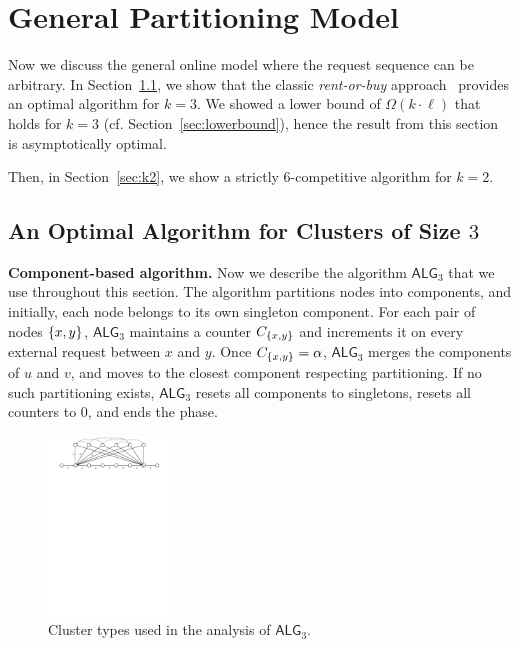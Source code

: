 \documentclass[manuscript,screen=true, review, anonymous]{acmart}
\newcommand{\OPT}{\textsf{OPT}\xspace}
\newcommand{\OBRP}{BRP}
\newcommand{\TAlg}{{\ensuremath{\textsf{ALG}_{3}}}\xspace}
\DeclarePairedDelimiter\set{\{}{\}}
\newcommand\maciek[1]{}
\begin{document}

\section{General Partitioning Model}
\label{sec:part}


Now  we discuss the general online
model where the request sequence
can be arbitrary.
In Section~\ref{sec:k3}, we show that the classic \emph{rent-or-buy} approach~\cite{karlin-ski-rental} provides an optimal algorithm for $k=3$.
We showed a lower bound of $\Omega(k \cdot \ell)$ that holds for $k=3$ (cf. Section~\ref{sec:lowerbound}), hence the result from this section is asymptotically optimal.

Then, in Section~\ref{sec:k2}, we show a strictly $6$-competitive algorithm for $k=2$.
\maciek{Intro: compare to previous 7-competitive algorithm. Note strict competitive ratio vs large additive term. Also, emphasize that the algorithm is different than 7-competitive}



\subsection{An Optimal Algorithm for Clusters of Size $3$}
\label{sec:k3}




\noindent
\textbf{Component-based algorithm.}
Now we describe the algorithm \TAlg that we use throughout this section.
The algorithm partitions nodes into components, and
initially, each node belongs to its own singleton component.
For each pair of nodes $\set{x,y}$, \TAlg maintains a counter $C_{\set{x,y}}$ and increments it on every external request between $x$ and $y$.
Once $C_{\set{x,y}} = \alpha$, \TAlg merges the components of $u$ and $v$, and moves to the closest component respecting partitioning.
If no such partitioning exists, \TAlg resets all components to singletons, resets all counters to $0$, and ends the phase.


\begin{figure}[H]
	\centering
	\includegraphics[width=0.3\textwidth]{figs/substitute}
	\caption{Cluster types used in the analysis of \TAlg.}
\end{figure}
\end{document}
